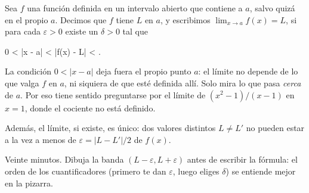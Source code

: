%

\begin{frame}


\begin{definition}[Límite]
Sea $f$ una función definida en un intervalo abierto que contiene a $a$,
salvo quizá en el propio $a$. Decimos que $f$ tiene  $L$ en
$a$, y escribimos $\lim_{x \to a} f(x) = L$, si para cada $\varepsilon > 0$
existe un $\delta > 0$ tal que
\begin{keyformula}
  0 < |x - a| < \delta \implies |f(x) - L| < \varepsilon .
\end{keyformula}
\end{definition}

\begin{notesonly}
La condición $0 < |x - a|$ deja fuera el propio punto $a$: el límite no
depende de lo que valga $f$ en $a$, ni siquiera de que esté definida allí.
Solo mira lo que pasa \emph{cerca} de $a$. Por eso tiene sentido preguntarse
por el límite de $(x^2 - 1)/(x - 1)$ en $x = 1$, donde el cociente no está
definido.

Además, el límite, si existe, es único: dos valores distintos $L \neq L'$ no
pueden estar a la vez a menos de $\varepsilon = |L - L'|/2$ de $f(x)$.
\end{notesonly}

\begin{teaching}[Ritmo]
Veinte minutos. Dibuja la banda $(L - \varepsilon, L + \varepsilon)$ antes de
escribir la fórmula: el orden de los cuantificadores (primero te dan
$\varepsilon$, luego eliges $\delta$) se entiende mejor en la pizarra.
\end{teaching}
\end{frame}
